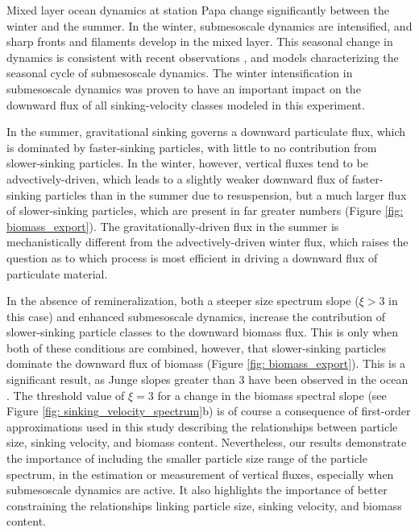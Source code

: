 \documentclass[article,linenumbers]{agujournal2018}
\begin{document}
	Mixed layer ocean dynamics at station Papa change significantly between the winter and the summer. In the winter, submesoscale dynamics are intensified, and sharp fronts and filaments develop in the mixed layer. This seasonal change in dynamics is consistent with recent observations \citep{Thompson_2016, Buckingham_2016}, and models \citep{Brannigan_2015, Callies_2015, Rocha_2016} characterizing the seasonal cycle of submesoscale dynamics. The winter intensification in submesoscale dynamics was proven to have an important impact on the downward flux of all sinking-velocity classes modeled in this experiment.
	
	In the summer,  gravitational sinking governs a downward particulate flux, which is dominated by faster-sinking particles, with little to no contribution from slower-sinking particles. In the winter, however, vertical fluxes tend to be advectively-driven, which leads to a slightly weaker downward flux of faster-sinking particles than in the summer due to resuspension, but a much larger flux of slower-sinking particles, which are present in far greater numbers (Figure \ref{fig: biomass_export}). The gravitationally-driven flux in the summer is mechanistically different from the advectively-driven winter flux, which raises the question as to which process is most efficient in driving a downward flux of particulate material.
	
	In the absence of remineralization, both a steeper size spectrum slope ($\xi>3$ in this case) and enhanced submesoscale dynamics, increase the contribution of slower-sinking particle classes to the downward biomass flux. This is only when both of these conditions are combined, however, that slower-sinking particles dominate the downward flux of biomass (Figure \ref{fig: biomass_export}). This is a significant result, as Junge slopes greater than 3 have been observed in the ocean \citep{Kostadinov_2009, White_2015}. The threshold value of $\xi =3$ for a change in the biomass spectral slope (see Figure \ref{fig: sinking_velocity_spectrum}b) is of course a consequence of first-order approximations used in this study describing the relationships between particle size, sinking velocity, and biomass content. Nevertheless, our results demonstrate the importance of including the smaller particle size range of the particle spectrum,  in the estimation or measurement of vertical fluxes, especially when submesoscale dynamics are active. It also highlights the importance of better constraining the relationships linking particle size, sinking velocity, and biomass content.
	
\end{document}
